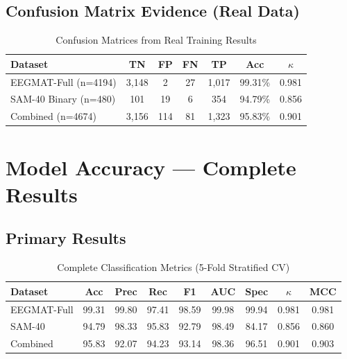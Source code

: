 \documentclass[11pt,a4paper]{article}
\begin{document}
\subsection{Confusion Matrix Evidence (Real Data)}

\begin{table}[H]
\centering
\caption{Confusion Matrices from Real Training Results}
\small
\begin{tabular}{lcccccc}
\toprule
\textbf{Dataset} & \textbf{TN} & \textbf{FP} & \textbf{FN} & \textbf{TP} & \textbf{Acc} & \textbf{$\kappa$} \\
\midrule
EEGMAT-Full (n=4194) & 3,148 & 2 & 27 & 1,017 & 99.31\% & 0.981 \\
SAM-40 Binary (n=480) & 101 & 19 & 6 & 354 & 94.79\% & 0.856 \\
Combined (n=4674) & 3,156 & 114 & 81 & 1,323 & 95.83\% & 0.901 \\
\bottomrule
\end{tabular}
\end{table}

\section{Model Accuracy --- Complete Results}

\subsection{Primary Results}

\begin{table}[H]
\centering
\caption{Complete Classification Metrics (5-Fold Stratified CV)}
\small
\begin{tabular}{lcccccccc}
\toprule
\textbf{Dataset} & \textbf{Acc} & \textbf{Prec} & \textbf{Rec} & \textbf{F1} & \textbf{AUC} & \textbf{Spec} & \textbf{$\kappa$} & \textbf{MCC} \\
\midrule
EEGMAT-Full & 99.31 & 99.80 & 97.41 & 98.59 & 99.98 & 99.94 & 0.981 & 0.981 \\
SAM-40 & 94.79 & 98.33 & 95.83 & 92.79 & 98.49 & 84.17 & 0.856 & 0.860 \\
Combined & 95.83 & 92.07 & 94.23 & 93.14 & 98.36 & 96.51 & 0.901 & 0.903 \\
\bottomrule
\end{tabular}
\end{table}
\end{document}
